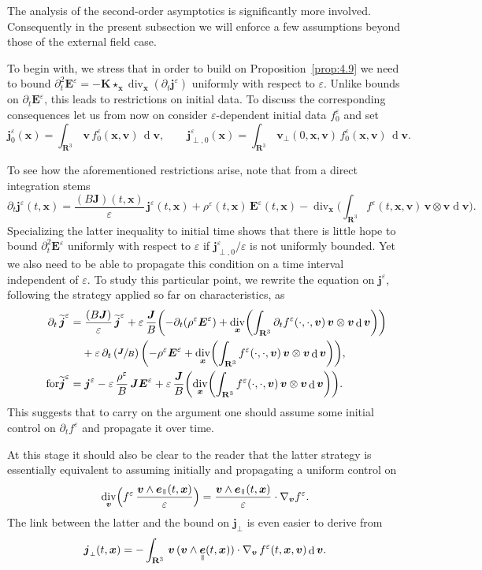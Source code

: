 \documentclass[JEP,XML,SOM,Unicode]{cedram}
\newcommand{\sperp}{{\scriptscriptstyle\perp}}
\let\eps\varepsilon
\let\d\partial
\DeclareMathOperator\dD{d}\let\dd\dD
\DeclareMathOperator{\Div}{div}
\theoremstyle{plain}
\theoremstyle{definition}
\newcommand\R{\mathbf R}
\newcommand\bE{{\boldsymbol E}}
\newcommand\bJ{{\boldsymbol J}}
\newcommand\bK{{\boldsymbol K}}
\newcommand\bfj{{\boldsymbol j}}
\newcommand\bfv{{\boldsymbol v}}
\newcommand\bfx{{\boldsymbol x}}
\DeclareMathOperator{\beD}{\boldsymbol{e}}
\newcommand\eDpar{\beD_\mypar}
\newcommand\bvperp{\bfv_{\!\sperp}}
\newcommand{\mypar}{{\mkern3mu\vphantom{\perp}\vrule depth 0pt\mkern2mu\vrule depth 0pt\mkern3mu}}
\begin{document}
The analysis of the second-order asymptotics is significantly more involved. Consequently in the present subsection we will enforce a few assumptions beyond those of the external field case.

To begin with, we stress that in order to build on Proposition~\ref{prop:4.9} we need to bound $\d_t^2\bE^\eps=-\bK\star_\bfx \Div_\bfx(\d_t\bfj^\eps)$ uniformly with respect to $\eps$. Unlike bounds on $\d_t\bE^\eps$, this leads to restrictions on initial data. To discuss the corresponding consequences let us from now on consider $\eps$-dependent initial data $f_0^\eps$ and set
\[
\bfj_0^\eps(\bfx)=
\int_{\R^3}\,\bfv\,f_0^\eps(\bfx,\bfv)\,\dD \bfv,\qquad
\bfj_{\perp,0}^\eps(\bfx)=
\int_{\R^3}\,\bvperp(0,\bfx,\bfv)\,f_0^\eps(\bfx,\bfv)\,\dD \bfv.
\]

To see how the aforementioned restrictions arise, note that from a direct integration stems
\[
\d_t\bfj^\eps(t,\bfx)
=\frac{(B\bJ)(t,\bfx)}{\eps}\,\bfj^\eps(t,\bfx)
+\rho^\eps(t,\bfx)\,\bE^\eps(t,\bfx)
-\Div_\bfx\biggl(\int_{\R^3}f^\eps(t,\bfx,\bfv)\,\bfv\otimes\bfv\dD \bfv\biggr).
\]
Specializing the latter inequality to initial time shows that there is little hope to bound $\d_t^2\bE^\eps$ uniformly with respect to $\eps$ if $\bfj_{\perp,0}^\eps/\eps$ is not uniformly bounded. Yet we also need to be able to propagate this condition on a time interval independent of $\eps$. To study this particular point, we rewrite the equation on $\bfj^\eps$, following the strategy applied so far on characteristics, as
\begin{align*}
\d_t\,\widetilde{\bfj}^\eps
&
=\frac{(B\bJ)}{\eps}\,\widetilde{\bfj}^\eps
+\eps\,\frac{\bJ}{B}\biggl(
-\d_t(\rho^\eps\bE^\eps)
+\Div_\bfx\biggl(\int_{\R^3}\d_tf^\eps(\cdot,\cdot,\bfv)\,\bfv\otimes\bfv\dD \bfv\biggr)\biggr)
\\
&\hphantom{{}=}
+\eps\,\d_t\left(\sfrac{\bJ}{B}\right)\biggl(
-\rho^\eps\bE^\eps
+\Div_\bfx\biggl(\int_{\R^3}f^\eps(\cdot,\cdot,\bfv)\,\bfv\otimes\bfv\dD \bfv\biggr)\biggr),\\
\tag*{for}
\widetilde{\bfj}^\eps
&=
\bfj^\eps-\eps\,\frac{\rho^\eps}{B}\,\bJ\bE^\eps
+\eps\,\frac{\bJ}{B}\biggl(\Div_\bfx\biggl(\int_{\R^3}f^\eps(\cdot,\cdot,\bfv)\,\bfv\otimes\bfv\dD \bfv\biggr)\biggr).
\end{align*}
This suggests that to carry on the argument one should assume some initial control on $\d_tf^\eps$ and propagate it over time.

At this stage it should also be clear to the reader that the latter strategy is essentially equivalent to assuming initially and propagating a uniform control on
\[
\Div_\bfv\Bigl(f^\eps\,\frac{\bfv\wedge \eDpar(t,\bfx)}{\eps}\Bigr)
=\frac{\bfv\wedge \eDpar(t,\bfx)}{\eps}\cdot\nabla_\bfv f^\eps.
\]
The link between the latter and the bound on $\bfj_\sperp$ is even easier to derive from
\[
\bfj_\sperp(t,\bfx)=
-\int_{\R^3}\,\bfv\,(\bfv\wedge \eDpar(t,\bfx))\cdot\nabla_\bfv\,f^\eps(t,\bfx,\bfv)\dD \bfv.
\]
\end{document}

